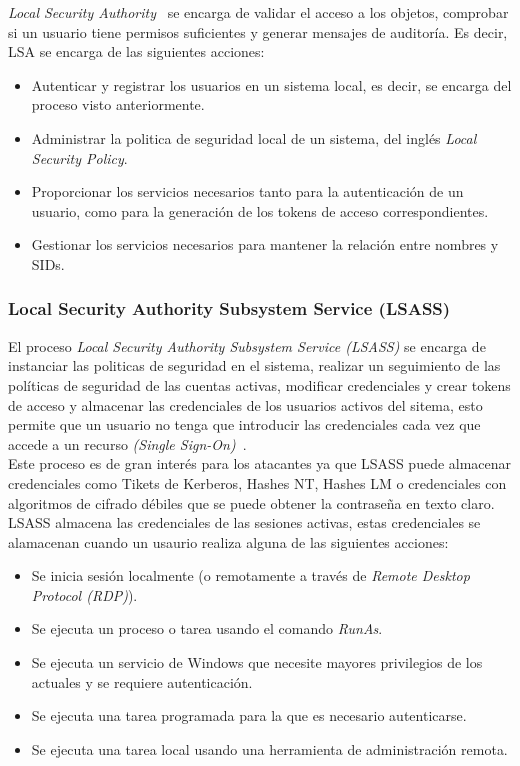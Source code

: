 {\it Local Security Authority}~\cite{Capitulo2:LSA} se encarga de validar el acceso a los objetos, comprobar si un usuario tiene permisos suficientes y generar mensajes de auditoría. Es decir, LSA se encarga de las siguientes acciones:

\begin{itemize}
\item Autenticar y registrar los usuarios en un sistema local, es decir, se encarga del proceso visto anteriormente. 
\item Administrar la politica de seguridad local de un sistema, del inglés {\it Local Security Policy}.
\item Proporcionar los servicios necesarios tanto para la autenticación de un usuario, como para la generación de los tokens de acceso correspondientes.
\item Gestionar los servicios necesarios para mantener la relación entre nombres y SIDs.
\end{itemize}

\subsubsection{Local Security Authority Subsystem Service (LSASS)}

El proceso {\it Local Security Authority Subsystem Service (LSASS)} se encarga de instanciar las politicas de seguridad en el sistema, realizar un seguimiento de las políticas de seguridad de las cuentas activas, modificar credenciales y crear tokens de acceso y almacenar las credenciales de los usuarios activos del sitema, esto permite que un usuario no tenga que introducir las credenciales cada vez que accede a un recurso {\it (Single Sign-On)}~\cite{Capitulo2:SingleSignOn}.\\

Este proceso es de gran interés para los atacantes ya que LSASS puede almacenar credenciales como Tikets de Kerberos, Hashes NT, Hashes LM o credenciales con algoritmos de cifrado débiles que se puede obtener la contraseña en texto claro.\\

LSASS almacena las credenciales de las sesiones activas, estas credenciales se alamacenan cuando un usaurio realiza alguna de las siguientes acciones:

\begin{itemize}
\item Se inicia sesión localmente (o remotamente a través de {\it Remote Desktop Protocol (RDP)}). 
\item Se ejecuta un proceso o tarea usando el comando {\it RunAs}.
\item Se ejecuta un servicio de Windows que necesite mayores privilegios de los actuales y se requiere autenticación.
\item Se ejecuta una tarea programada para la que es necesario autenticarse. 
\item Se ejecuta una tarea local usando una herramienta de administración remota. 
\end{itemize}

